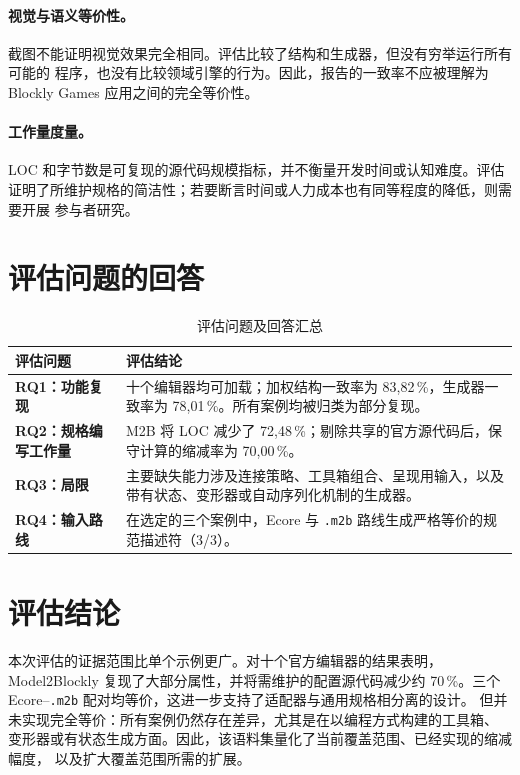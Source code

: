\paragraph{视觉与语义等价性。}
截图不能证明视觉效果完全相同。评估比较了结构和生成器，但没有穷举运行所有可能的
程序，也没有比较领域引擎的行为。因此，报告的一致率不应被理解为 Blockly Games
应用之间的完全等价性。

\paragraph{工作量度量。}
LOC 和字节数是可复现的源代码规模指标，并不衡量开发时间或认知难度。评估
证明了所维护规格的简洁性；若要断言时间或人力成本也有同等程度的降低，则需要开展
参与者研究。

\section{评估问题的回答}
\label{sec:respuesta-rq}

\begin{table}[htbp]
  \centering
  \caption{评估问题及回答汇总}
  \label{tab:respuesta-rq}
  \footnotesize
  \begin{tabular}{L{0.24\textwidth}L{0.68\textwidth}}
    \toprule
    评估问题 & 评估结论 \\
    \midrule
    \textbf{RQ1：功能复现} & 十个编辑器均可加载；加权结构一致率为 83,82\,\%，生成器一致率为 78,01\,\%。所有案例均被归类为部分复现。 \\
    \textbf{RQ2：规格编写工作量} & M2B 将 LOC 减少了 72,48\,\%；剔除共享的官方源代码后，保守计算的缩减率为 70,00\,\%。 \\
    \textbf{RQ3：局限} & 主要缺失能力涉及连接策略、工具箱组合、呈现用输入，以及带有状态、变形器或自动序列化机制的生成器。 \\
    \textbf{RQ4：输入路线} & 在选定的三个案例中，Ecore 与 \texttt{.m2b} 路线生成严格等价的规范描述符（3/3）。 \\
    \bottomrule
  \end{tabular}
\end{table}

\section{评估结论}
\label{sec:conclusion-evaluacion}

本次评估的证据范围比单个示例更广。对十个官方编辑器的结果表明，\allowbreak{}Model2Blockly
复现了大部分属性，并将需维护的配置源代码减少约 70\,\%。三个
Ecore--\texttt{.m2b} 配对均等价，这进一步支持了适配器与通用规格相分离的设计。
但并未实现完全等价：所有案例仍然存在差异，尤其是在以编程方式构建的工具箱、
变形器或有状态生成方面。因此，该语料集量化了当前覆盖范围、已经实现的缩减幅度，
以及扩大覆盖范围所需的扩展。
